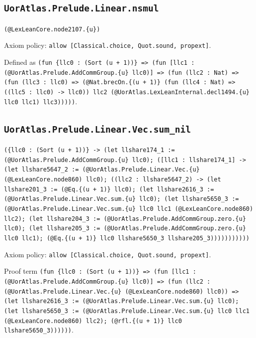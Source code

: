 \documentclass[11pt]{article}
\begin{document}
\subsection*{\texttt{UorAtlas.Prelude.Linear.nsmul}}
\noindent\texttt{(@LexLeanCore.node2107.\{u\})}\par
\noindent Axiom policy: \texttt{allow [Classical.choice, Quot.sound, propext]}.\par
\noindent Defined as \texttt{(fun \{llc0 : (Sort (u + 1))\} => (fun [llc1 : (@UorAtlas.Prelude.AddCommGroup.\{u\} llc0)] => (fun (llc2 : Nat) => (fun (llc3 : llc0) => (@Nat.brecOn.\{(u + 1)\} (fun (llc4 : Nat) => ((llc5 : llc0) -> llc0)) llc2 (@UorAtlas.LexLeanInternal.decl1494.\{u\} llc0 llc1) llc3)))))}.\par
\subsection*{\texttt{UorAtlas.Prelude.Linear.Vec.sum\_nil}}
\noindent\texttt{(\{llc0 : (Sort (u + 1))\} -> (let llshare174\_1 := (@UorAtlas.Prelude.AddCommGroup.\{u\} llc0); ([llc1 : llshare174\_1] -> (let llshare5647\_2 := (@UorAtlas.Prelude.Linear.Vec.\{u\} (@LexLeanCore.node860) llc0); ((llc2 : llshare5647\_2) -> (let llshare201\_3 := (@Eq.\{(u + 1)\} llc0); (let llshare2616\_3 := (@UorAtlas.Prelude.Linear.Vec.sum.\{u\} llc0); (let llshare5650\_3 := (@UorAtlas.Prelude.Linear.Vec.sum.\{u\} llc0 llc1 (@LexLeanCore.node860) llc2); (let llshare204\_3 := (@UorAtlas.Prelude.AddCommGroup.zero.\{u\} llc0); (let llshare205\_3 := (@UorAtlas.Prelude.AddCommGroup.zero.\{u\} llc0 llc1); (@Eq.\{(u + 1)\} llc0 llshare5650\_3 llshare205\_3)))))))))))}\par
\noindent Axiom policy: \texttt{allow [Classical.choice, Quot.sound, propext]}.\par
\noindent Proof term \texttt{(fun \{llc0 : (Sort (u + 1))\} => (fun [llc1 : (@UorAtlas.Prelude.AddCommGroup.\{u\} llc0)] => (fun (llc2 : (@UorAtlas.Prelude.Linear.Vec.\{u\} (@LexLeanCore.node860) llc0)) => (let llshare2616\_3 := (@UorAtlas.Prelude.Linear.Vec.sum.\{u\} llc0); (let llshare5650\_3 := (@UorAtlas.Prelude.Linear.Vec.sum.\{u\} llc0 llc1 (@LexLeanCore.node860) llc2); (@rfl.\{(u + 1)\} llc0 llshare5650\_3))))))}.\par
\end{document}
